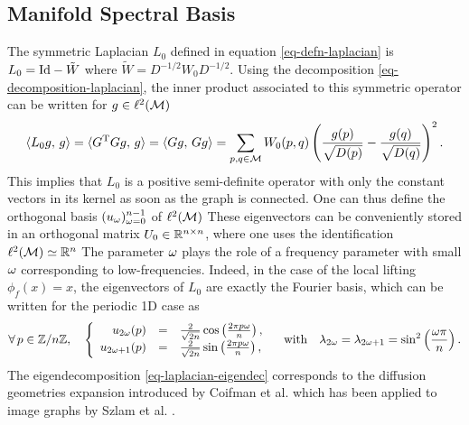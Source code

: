 \documentclass[final]{siamltex}
\newcommand{\manilift}{\phi_f}
\begin{document}
\subsection{Manifold Spectral Basis}
\label{subsec-spectral-basis}

The symmetric Laplacian $L_0$ defined in equation \eqref{eq-defn-laplacian} is $L_0 = \mathrm{Id} - \tilde W$ where $\tilde W = D^{-1/2}W_0 D^{-1/2}$. Using the decomposition \eqref{eq-decomposition-laplacian}, the inner product associated to this symmetric operator can be written for $g  \in \ell^2(\mathcal{M})$
\begin{equation*}
	\langle L_0 g,\,g\rangle = \langle {G}^{\mathrm{T}}G g,\,g\rangle = \langle G g,\,G g\rangle = \sum_{p,q \in \mathcal{M}} 
		W_0(p,q) \left(  \frac{g(p)}{\sqrt{D(p)}}-\frac{g(q)}{\sqrt{D(q)}}  \right)^2.
\end{equation*}
This implies that $L_0$ is a positive semi-definite operator with only the constant vectors in its kernel as soon as the graph is connected. One can thus define the orthogonal basis $(u_\omega)_{\omega = 0}^{n-1}$ of $\ell^2(\mathcal{M})$
These eigenvectors can be conveniently stored in an orthogonal matrix $U_0 \in \mathbb{R}^{n \times n}$, where one uses the identification $\ell^2(\mathcal{M}) \simeq \mathbb{R}^n$
The parameter $\omega$ plays the role of a frequency parameter with small $\omega$ corresponding to low-frequencies. Indeed, in the case of the local lifting $\manilift(x)=x$, the eigenvectors of $L_0$ are exactly the Fourier basis, which can be written for the periodic 1D case as
\begin{equation}
	\label{eq-defn-eig-fourier}
	\foralls p \in \ZZ/n\ZZ, \quad
	\left\{
	\begin{array}{rcl}
	u_{2\om}(p) &=& \frac{2}{\sqrt{2n}}\cos\pa{ \frac{2\pi p \om}{n} },\\
	u_{2\om+1}(p) &=& \frac{2}{\sqrt{2n}}\sin\pa{ \frac{2\pi p \om}{n} },
	\end{array}
	\right.
	\qwithq
	\la_{2\om} = \la_{2\om+1} = \sin^2\pa{ \frac{\om\pi}{n} }.
\end{equation}
The eigendecomposition \eqref{eq-laplacian-eigendec} corresponds to the diffusion geometries expansion introduced by Coifman et al. \cite{coifman-geometric-diffusion} which has been applied to image graphs by Szlam et al. \cite{szlam-regularization}.
\end{document}
